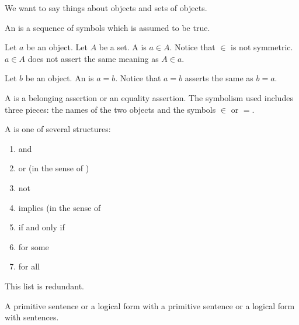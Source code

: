 
\sbasic



\sstart
{}


We want to say things
about objects and sets
of objects.


An 
is a sequence of symbols
which is assumed to be true.

Let $a$ be an object.
Let $A$ be a set.
A 
is $a \in A$.
Notice that $\in$ is not symmetric.
$a \in A$ does not assert the same
meaning as
$A \in a$.

Let $b$ be an object.
An 
is $a = b$.
Notice that $a = b$
asserts the same as $b = a$.

A 
is a belonging assertion
or an equality assertion.
The symbolism used includes
three pieces: the names of the two
objects and the symbols $\in$ or $=$.

A  is one of
several structures:
\begin{enumerate}

  \item

    and

  \item

    or (in the sense of )

  \item

    not

  \item

    implies (in the sense of 

  \item

    if and only if

  \item

    for some

  \item

    for all
\end{enumerate}

This list is redundant.

A  primitive sentence
or a logical form with a primitive
sentence or a logical form with
sentences.
\strats
